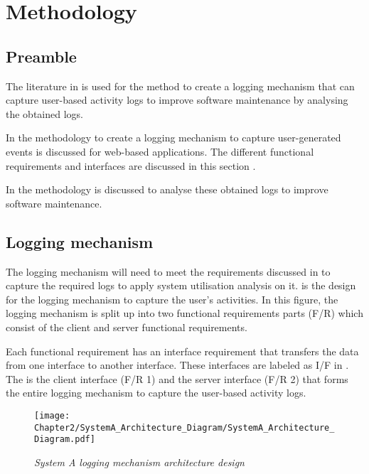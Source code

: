 \chapter{Methodology}
\label{chap:2}

\section{Preamble} The literature in  is used for the method to create a logging mechanism that can capture user-based activity logs to improve software maintenance by analysing the obtained logs.\par In  the methodology to create a logging mechanism to capture user-generated events is discussed for web-based applications. The different functional requirements and interfaces are discussed in this section \cite{Anish2015}.\par In  the methodology is discussed to analyse these obtained logs to improve software maintenance.

\section{Logging mechanism}\label{Ch2:LoggingMechanism} The logging mechanism will need to meet the requirements discussed in  to capture the required logs to apply system utilisation analysis on it.  is the design for the logging mechanism to capture the user's activities. In this figure, the logging mechanism is split up into two functional requirements parts (F/R) which consist of the client and server functional requirements.\par Each functional requirement has an interface requirement that transfers the data from one interface to another interface. These interfaces are labeled as I/F in . The  is the client interface (F/R 1) and the server interface (F/R 2) that forms the entire logging mechanism to capture the user-based activity logs.

\begin{figure}[!htb] %
	\centering %
	\texttt{[image: Chapter2/SystemA\_Architecture\_Diagram/SystemA\_Architecture\_Diagram.pdf]}
	\caption[System A logging mechanism architecture design]
	{\textit{System A logging mechanism architecture design}}\label{fig:CH2_SystemA_Arch_Design}
\end{figure}

